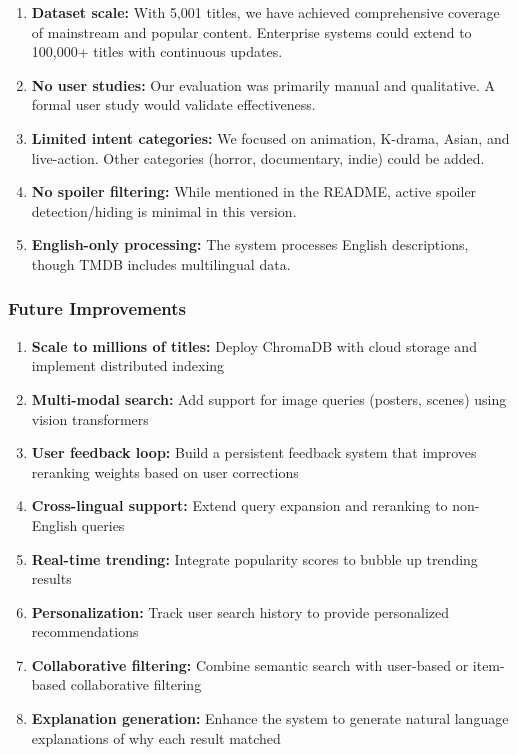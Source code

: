 \documentclass[11pt,a4paper]{article}
\begin{document}
\begin{enumerate}
    \item \textbf{Dataset scale:} With 5,001 titles, we have achieved comprehensive coverage of mainstream and popular content. Enterprise systems could extend to 100,000+ titles with continuous updates.
    \item \textbf{No user studies:} Our evaluation was primarily manual and qualitative. A formal user study would validate effectiveness.
    \item \textbf{Limited intent categories:} We focused on animation, K-drama, Asian, and live-action. Other categories (horror, documentary, indie) could be added.
    \item \textbf{No spoiler filtering:} While mentioned in the README, active spoiler detection/hiding is minimal in this version.
    \item \textbf{English-only processing:} The system processes English descriptions, though TMDB includes multilingual data.
\end{enumerate}

\subsubsection{Future Improvements}

\begin{enumerate}
    \item \textbf{Scale to millions of titles:} Deploy ChromaDB with cloud storage and implement distributed indexing
    \item \textbf{Multi-modal search:} Add support for image queries (posters, scenes) using vision transformers
    \item \textbf{User feedback loop:} Build a persistent feedback system that improves reranking weights based on user corrections
    \item \textbf{Cross-lingual support:} Extend query expansion and reranking to non-English queries
    \item \textbf{Real-time trending:} Integrate popularity scores to bubble up trending results
    \item \textbf{Personalization:} Track user search history to provide personalized recommendations
    \item \textbf{Collaborative filtering:} Combine semantic search with user-based or item-based collaborative filtering
    \item \textbf{Explanation generation:} Enhance the system to generate natural language explanations of why each result matched
\end{enumerate}
\end{document}
